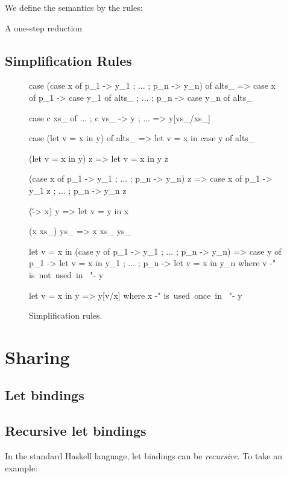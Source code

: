 We define the semantics by the rules:

A one-step reduction


\subsection{Simplification Rules}

\begin{figure}
\begin{code}
case (case x of {p_1 -> y_1 ; ... ; p_n -> y_n}) of alts_
    => case x of  {  p_1  -> case y_1 of alts_
                  ;  ...
                  ;  p_n  -> case y_n of alts_ }

case c xs_ of {... ; c vs_ -> y ; ...}
    => y[vs_/xs_]

case (let v = x in y) of alts_
    => let v = x in case y of alts_

(let v = x in y) z
    => let v = x in y z

(case x of {p_1 -> y_1 ; ... ; p_n -> y_n}) z
    => case x of {p_1 -> y_1 z ; ... ; p_n -> y_n z}

(\v -> x) y
    => let v = y in x

(x xs_) ys_
    => x xs_ ys_

let v = x in (case y of {p_1 -> y_1 ; ... ; p_n -> y_n})
    => case y of  {  p_1  -> let v = x in y_1
                  ;  ...
                  ;  p_n  -> let v = x in y_n}
    where v {-" \hbox{is not used in } "-} y

let v = x in y
    => y[v/x]
    where x {-" \hbox{is used once in } "-} y
\end{code}
\caption{Simplification rules.}
\label{fig:simplify}
\end{figure}



\section{Sharing}

\subsection{Let bindings}



\subsection{Recursive let bindings}

In the standard Haskell language, let bindings can be \textit{recursive}. To take an example:

